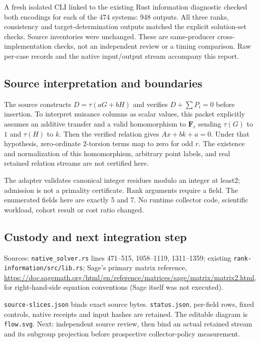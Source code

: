 \documentclass[10pt]{article}
\begin{document}
A fresh isolated CLI linked to the existing Rust information diagnostic checked both encodings for each of the 474 systems: 948 outputs. All three ranks, consistency and target-determination outputs matched the explicit solution-set checks. Source inventories were unchanged. These are same-producer cross-implementation checks, not an independent review or a timing comparison. Raw per-case records and the native input/output stream accompany this report.
\subsection*{Source interpretation and boundaries}
The source constructs $D=\tau(aG+bH)$ and verifies $D+\sum P_i=0$ before insertion. To interpret nuisance columns as scalar values, this packet explicitly assumes an additive transfer and a valid homomorphism to $\mathbf F_r$ sending $\tau(G)$ to $1$ and $\tau(H)$ to $k$. Then the verified relation gives $Ax+bk+a=0$. Under that hypothesis, zero-ordinate 2-torsion terms map to zero for odd $r$. The existence and normalization of this homomorphism, arbitrary point labels, and real retained relation streams are not certified here.

The adapter validates canonical integer residues modulo an integer at least2; admission is not a primality certificate. Rank arguments require a field. The enumerated fields here are exactly 5 and 7. No runtime collector code, scientific workload, cohort result or cost ratio changed.
\subsection*{Custody and next integration step}
Sources: \texttt{native\_solver.rs} lines 471--515, 1058--1119, 1311--1359; existing \texttt{rank-information/src/lib.rs}; Sage's primary matrix reference, \url{https://doc.sagemath.org/html/en/reference/matrices/sage/matrix/matrix2.html}, for right-hand-side equation conventions (Sage itself was not executed).

\texttt{source-slices.json} binds exact source bytes. \texttt{status.json}, per-field rows, fixed controls, native receipts and input hashes are retained. The editable diagram is \texttt{flow.svg}. Next: independent source review, then bind an actual retained stream and its subgroup projection before prospective collector-policy measurement.
\end{document}

